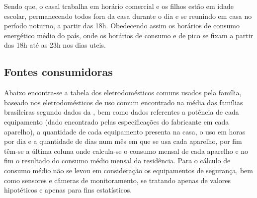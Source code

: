 	Sendo que, o casal trabalha em horário comercial e os filhos estão em idade escolar, permanecendo todos fora da casa durante o dia e se reunindo em casa no período noturno, a partir das 18h. Obedecendo assim os horários de consumo energético médio do país, onde os horários de consumo e de pico se fixam a partir das 18h até as 23h nos dias uteis.

\subsection{Fontes consumidoras}

	Abaixo encontra-se a tabela dos eletrodomésticos comuns usados pela família, baseado nos eletrodomésticos de uso comum encontrado na média das famílias brasileiras segundo dados da \cite{2013Aneel}, bem como dados referentes a potência de cada equipamento (dado encontrado pelas especificações do fabricante em cada aparelho), a quantidade de cada equipamento presenta na casa, o uso em horas por dia e a quantidade de dias num mês em que se usa cada aparelho, por fim têm-se a última coluna onde calcula-se o consumo mensal de cada aparelho e no fim o resultado do consumo médio mensal da residência. Para o cálculo de consumo médio não se levou em consideração os equipamentos de segurança, bem como sensores e câmeras de monitoramento, se tratando apenas de valores hipotéticos e apenas para fins estatísticos.

